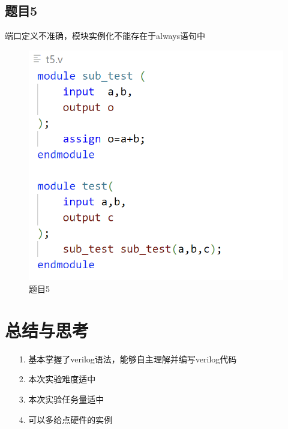 \documentclass{article}
\begin{document}
    \subsection*{题目5} 端口定义不准确，模块实例化不能存在于always语句中
	\begin{figure}[htbp]
		\centering
		\includegraphics[scale=0.6]{t5.png}
		\caption*{题目5}
	\end{figure}

	\clearpage
    \section{总结与思考}
	\begin{enumerate}
		\item [1.]基本掌握了verilog语法，能够自主理解并编写verilog代码
		\item [2.]本次实验难度适中
		\item [3.]本次实验任务量适中
		\item [4.]可以多给点硬件的实例
	\end{enumerate}
\end{document}
